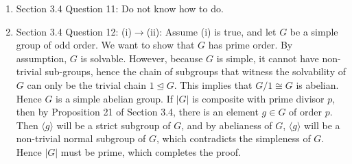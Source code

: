 \documentclass{article}
\begin{document}
\begin{enumerate}
  \item Section 3.4 Question 11: Do not know how to do.


  \item Section 3.4 Question 12: (i)$\rightarrow$(ii): Assume (i) is true,
    and let $G$ be a simple group of odd order. We want to show that $G$
    has prime order. By assumption, $G$ is solvable. However, because $G$
    is simple, it cannot have non-trivial sub-groups, hence the chain of
    subgroups that witness the solvability of $G$ can only be the trivial
    chain $1\trianglelefteq G$. This implies that $G/1\cong G$ is abelian.
    Hence $G$ is a simple abelian group. If $|G|$ is composite with prime
    divisor $p$, then by Proposition 21 of Section 3.4, there is an element
    $g\in G$ of order $p$. Then $\langle g\rangle$ will be a strict subgroup
    of $G$, and by abelianess of $G$, $\langle g\rangle$ will be a
    non-trivial normal subgroup of $G$, which contradicts the simpleness of
    $G$. Hence $|G|$ must be prime, which completes the proof. \\


\end{enumerate}
\end{document}
